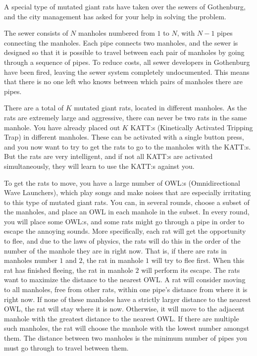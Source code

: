 \noindent
A special type of mutated giant rats have taken over the sewers of Gothenburg,
and the city management has asked for your help in solving the problem.

The sewer consists of $N$ manholes numbered from $1$ to $N$, with $N-1$ pipes connecting the manholes.
Each pipe connects two manholes, and the sewer is designed
so that it is possible to travel between each pair of manholes by going through a sequence of pipes.
To reduce costs, all sewer developers in Gothenburg have been fired,
leaving the sewer system completely undocumented.
This means that there is no one left who knows between which pairs of manholes there are pipes.

There are a total of $K$ mutated giant rats, located in different manholes.
As the rats are extremely large and aggressive, there can never be two rats in the same manhole.
You have already placed out $K$ KATT:s (Kinetically Activated Tripping Trap) in different manholes.
These can be activated with a single button press,
and you now want to try to get the rats to go to the manholes with the KATT:s.
But the rats are very intelligent, and if not all KATT:s are activated simultaneously, they will
learn to use the KATT:s against you.

To get the rats to move, you have a large number of OWL:s
(Omnidirectional Wave Launchers),
which play songs and make noises that are especially irritating to this type of mutated giant rats.
You can, in several rounds, choose a subset of the manholes, and place an OWL in each manhole in the subset.
In every round, you will place some OWL:s, and some rats might go through a pipe in order to escape the annoying sounds.
More specifically, each rat will get the opportunity to flee,
and due to the laws of physics, the rats will do this in the order of the number of the manhole they are in right now.
That is, if there are rats in manholes number $1$ and $2$, the rat in manhole $1$ will try to flee first.
When this rat has finished fleeing, the rat in manhole $2$ will perform its escape.
The rats want to maximize the distance to the nearest OWL.
A rat will consider moving to all manholes, free from other rats,
within one pipe's distance from where it is right now.
If none of these manholes have a strictly larger distance to the nearest OWL, the rat will stay where it is now.
Otherwise, it will move to the adjacent manhole with the greatest distance to the nearest OWL.
If there are multiple such manholes, the rat will choose the manhole with the lowest number amongst them.
The distance between two manholes is the minimum number of pipes you must go through to travel between them.

